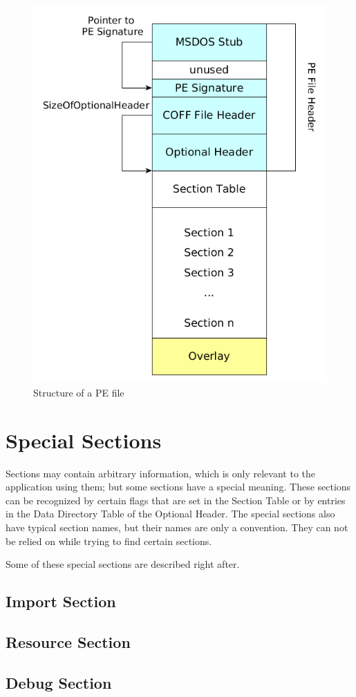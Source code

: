 \begin{figure}
\includegraphics[width=.98\textwidth, height=\textheight,keepaspectratio]{graphics/peformat}
\caption{Structure of a PE file }
\label{fig:peformat} 
\end{figure}

\section{Special Sections}

Sections may contain arbitrary information, which is only relevant to the application using them; but some sections have a special meaning. These sections can be recognized by certain flags that are set in the Section Table or by entries in the Data Directory Table of the Optional Header. The special sections also have typical section names, but their names are only a convention. They can not be relied on while trying to find certain sections.

Some of these special sections are described right after.

\subsection*{Import Section}

\subsection*{Resource Section}

\subsection*{Debug Section}
